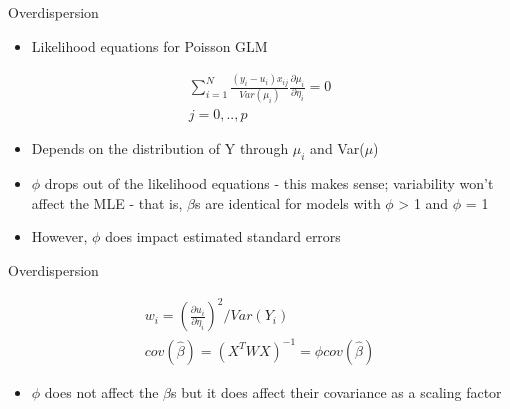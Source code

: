 \documentclass[ignorenonframetext,]{beamer}
\providecommand{\tightlist}{%
  \setlength{\itemsep}{0pt}\setlength{\parskip}{0pt}}
\begin{document}
\begin{frame}{Overdispersion}

\begin{itemize}
\tightlist
\item
  Likelihood equations for Poisson GLM
\end{itemize}

\[
\begin{aligned}
\sum_{i=1}^{N} \frac{(y_i - u_i)x_{ij}}{Var(\mu_i)} \frac{\partial\mu_i}{\partial\eta_i} = 0 \\
j = 0, ..,p
\end{aligned}
\]

\begin{itemize}
\item
  Depends on the distribution of Y through \(\mu_i\) and Var(\(\mu\))
\item
  \(\phi\) drops out of the likelihood equations - this makes sense;
  variability won't affect the MLE - that is, \(\beta\)s are identical
  for models with \(\phi\) \textgreater{} 1 and \(\phi\) = 1
\item
  However, \(\phi\) does impact estimated standard errors
\end{itemize}

\end{frame}

\begin{frame}{Overdispersion}

\[
\begin{aligned}
w_i = (\frac{\partial u_i}{\partial \eta_i})^2 / Var(Y_i) \\
cov(\hat{\beta}) = (X^TWX)^{-1} = \phi cov(\hat{\beta})
\end{aligned}
\]

\begin{itemize}
\tightlist
\item
  \(\phi\) does not affect the \(\beta\)s but it does affect their
  covariance as a scaling factor
\end{itemize}

\end{frame}
\end{document}
